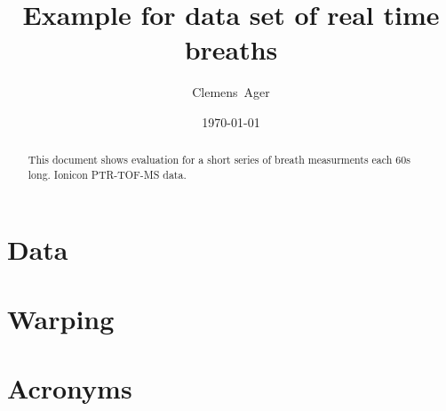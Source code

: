 \documentclass[twocolumn]{article}
\title{Example for data set of real time breaths}
\author{Clemens~Ager}
\date{\today}
\begin{document}
\maketitle

\begin{abstract}
  This document shows evaluation for a short series of breath
  measurments each \si{60}{s} long.
  Ionicon \ac{PTR-TOF-MS} data.  
\end{abstract}


\setcounter{tocdepth}{2}
\tableofcontents



\section{Data}


\section{Warping}


\appendix 
\section{Acronyms}


\printbibliography{}
\end{document}
